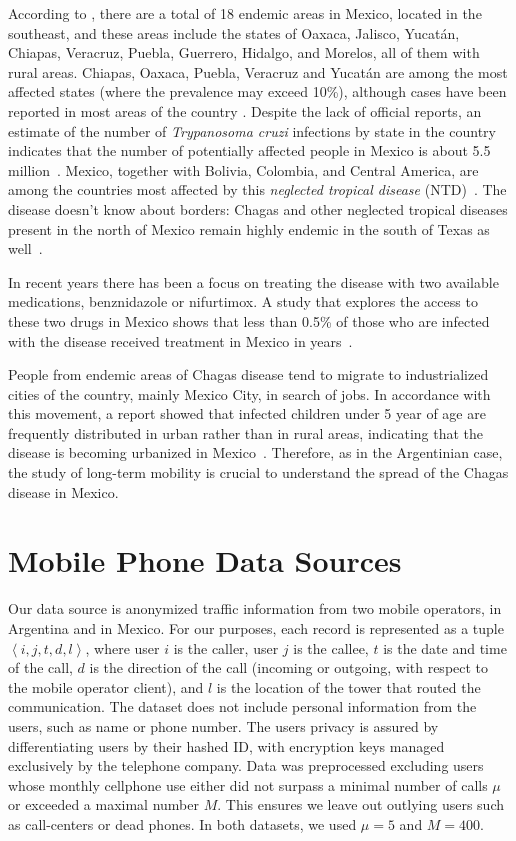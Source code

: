 According to \cite{dumonteil1999update}, 
there are a total of 18 endemic areas in Mexico, located in the southeast, and
these areas include the states of Oaxaca, Jalisco, Yucatán, Chiapas, Veracruz,
Puebla, Guerrero, Hidalgo, and Morelos, all of them with rural areas.
Chiapas, Oaxaca, Puebla, Veracruz and Yucatán are among the most affected states (where the prevalence may exceed 10\%), although cases have been reported in most areas of the country
\cite{cruz2006chagmex,dumonteil1999update}.
Despite the lack of official reports, an estimate of the number of \textit{Trypanosoma cruzi} infections by state in the country
indicates that the number of potentially
affected people in Mexico is about 5.5 million~\cite{carabarin2013chagas}.
Mexico, together with Bolivia, Colombia, and Central
America, are among the countries most affected by this 
\textit{neglected tropical disease} (NTD)~\cite{hotez2013innovation}.
The disease doesn't know about borders:
Chagas and other neglected tropical diseases present in the north of Mexico remain highly endemic in the south of Texas as well~\cite{hotez2012texas}.

In recent years there has been a focus on treating the disease with two available
medications, benznidazole or nifurtimox. A study
that explores the access to these two drugs in Mexico 
shows that less than 0.5\% of those who are infected with
the disease received treatment in Mexico in years~\cite{manne2013barriers}.


People from endemic areas of Chagas disease tend to migrate to industrialized cities of the country, mainly Mexico City, in search of jobs. 
In accordance with this movement, a report showed
that infected children under 5 year of age are frequently distributed in urban
rather than in rural areas, indicating that the disease is becoming urbanized in
Mexico~\cite{guzman2001epidemiology}.
Therefore, as in the Argentinian case, the study of long-term mobility is crucial to understand the spread of the Chagas disease in Mexico.



\section{Mobile Phone Data Sources}

Our data source is anonymized traffic information from two mobile operators, in Argentina and in Mexico.
For our purposes, each record is represented as a tuple $\left < i, j, t, d, l \right >$,
where user $i$ is the caller, user $j$ is the callee, $t$ is the date and time of the call,
$d$ is the direction of the call (incoming or outgoing, with respect to the mobile operator client), and $l$ is the location of the tower that routed the communication.
The dataset does not include personal information from the users, such as name or phone number. The users privacy is assured by differentiating users by their hashed ID, with encryption keys managed exclusively by the telephone company.
Data was preprocessed excluding users whose monthly cellphone use either did not surpass a minimal number of calls $\mu$ or exceeded a maximal number $M$. This ensures we leave out outlying users such as call-centers or dead phones. In both datasets, we used $\mu = 5$ and $M = 400$.

